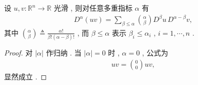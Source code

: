 \documentclass[../../main.tex]{subfiles}
\begin{document}
\begin{theorem}\label{theorem:ch01-leibniz}
设 \(u,v:\mathbb{R}^n\to\mathbb{R}\) 光滑 , 则对任意多重指标 \(\alpha\) 有
\begin{align*}
D^\alpha(uv)=\sum\limits_{\beta\leqslant\alpha}\binom{\alpha}{\beta}D^\beta u\,D^{\alpha-\beta}v,
\end{align*}
其中 \(\binom{\alpha}{\beta}\triangleq\frac{\alpha!}{\beta!(\alpha-\beta)!}\) , 而 \(\beta\leqslant\alpha\) 表示 \(\beta_i\leqslant\alpha_i\) , \(i=1,\cdots,n\) .
\end{theorem}
\begin{proof}
对 \(|\alpha|\) 作归纳 . 当 \(|\alpha|=0\) 时 , \(\alpha=0\) , 公式为
\begin{align*}
uv=\binom{0}{0}uv,
\end{align*}
显然成立 .


\end{proof}
\end{document}
